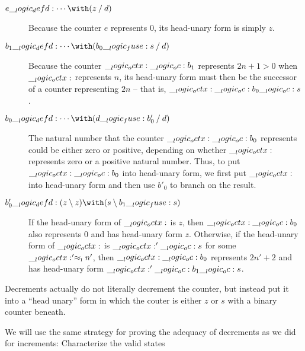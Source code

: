 \begin{description}
\item[$e \defd \dotsb \with (z \pmir d)$]
  Because the counter $e$ represents $0$, its head-unary form is simply $z$.
%
\item[$b_1 \defd \dotsb \with (b_0 \fuse s \pmir d)$]
  Because the counter $\__logic_octx: \__logic_oc: b_1$ represents $2n+1 > 0$ when $\__logic_octx:$ represents $n$, its head-unary form must then be the successor of a counter representing $2n$ -- that is, $\__logic_octx: \__logic_oc: b_0 \__logic_oc: s$.
%
\item[$b_0 \defd \dotsb \with (d \fuse b'_0 \pmir d)$]
  The natural number that the counter $\__logic_octx: \__logic_oc: b_0$ represents could be either zero or positive, depending on whether $\__logic_octx:$ represents zero or a positive natural number.
  Thus, to put $\__logic_octx: \__logic_oc: b_0$ into head-unary form, we first put $\__logic_octx:$ into head-unary form and then use $b'_0$ to branch on the result.
%
\item[$b'_0 \defd (z \limp z) \with (s \limp b_1 \fuse s)$]
  If the head-unary form of $\__logic_octx:$ is $z$, then $\__logic_octx: \__logic_oc: b_0$ also represents $0$ and has head-unary form $z$.
  Otherwise, if the head-unary form of $\__logic_octx:$ is $\__logic_octx:' \__logic_oc: s$ for some $\__logic_octx:' \approx\sb{\text{\normalfont\scshape i}} n'$, then $\__logic_octx: \__logic_oc: b_0$ represents $2n'+2$ and has head-unary form $\__logic_octx:' \__logic_oc: b_1 \__logic_oc: s$.
\end{description}

Decrements actually do not literally decrement the counter, but instead put it into a \enquote{head unary} form in which the couter is either $z$ or $s$ with a binary counter beneath.


We will use the same strategy for proving the adequacy of decrements as we did for increments:
Characterize the valid states

